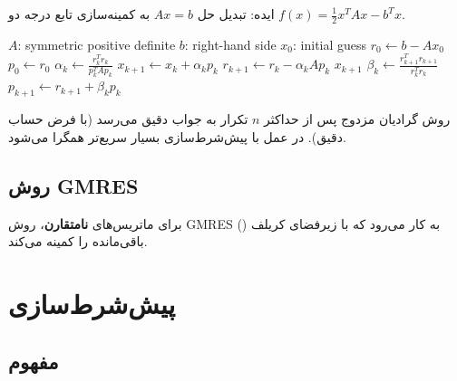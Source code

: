 \documentclass{matinbook}
\begin{document}
    ایده: تبدیل حل $Ax = b$ به
    کمینه‌سازی تابع درجه دو
    $f(x) = \frac{1}{2}x^{T}Ax - b^{T}x$.
    
    \begin{latin}
        \begin{algorithm}
            \begin{algorithmic}[1]
                \Require $A$: symmetric positive definite
                \Require $b$: right-hand side
                \Require $x_{0}$: initial guess
                \State $r_{0} \gets b - Ax_{0}$
                \State $p_{0} \gets r_{0}$
                \State $\alpha_{k} \gets \frac{r_{k}^{T} r_{k}}{p_{k}^{T} A p_{k}}$
                \State $x_{k+1} \gets x_{k} + \alpha_{k} p_{k}$
                \State $r_{k+1} \gets r_{k} - \alpha_{k} A p_{k}$
                \State \Return $x_{k+1}$
                \EndIf
                \State $\beta_{k} \gets \frac{r_{k+1}^{T} r_{k+1}}{r_{k}^{T} r_{k}}$
                \State $p_{k+1} \gets r_{k+1} + \beta_{k} p_{k}$
                \EndFor
            \end{algorithmic}
        \end{algorithm}
    \end{latin}
    
    \begin{theorem}[همگرایی CG]
        روش گرادیان مزدوج پس از
        حداکثر $n$ تکرار به جواب دقیق می‌رسد
        (با فرض حساب دقیق).
        در عمل با پیش‌شرط‌سازی
        بسیار سریع‌تر همگرا می‌شود.
        \label{thm:cg-convergence}
    \end{theorem}
    
    \subsection{روش GMRES}
    
    برای ماتریس‌های \textbf{نامتقارن}،
    روش GMRES
    ()
    به کار می‌رود که با زیرفضای کریلف
    باقی‌مانده را کمینه می‌کند.
    
    \section{پیش‌شرط‌سازی}
    
    \subsection{مفهوم}
    
\end{document}
